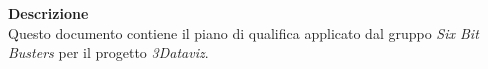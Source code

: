 \begin{titlepage}
\begin{center}
	\large \textbf{Descrizione} \\
	Questo documento contiene il piano di qualifica applicato dal gruppo \textit{Six Bit Busters}
	per il progetto \textit{3Dataviz}.
	
	\end{center}
\end{titlepage}
